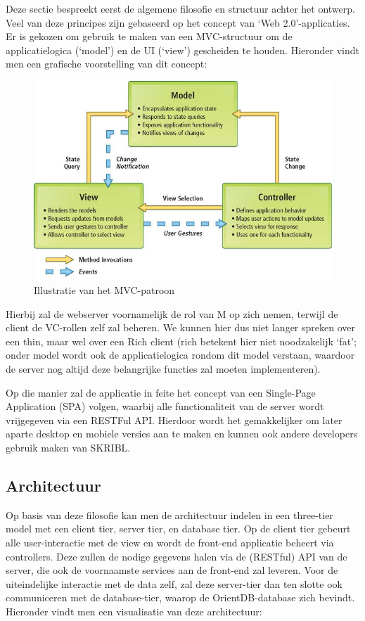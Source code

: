 \documentclass{article}
\begin{document}
Deze sectie bespreekt eerst de algemene filosofie en structuur achter het ontwerp. Veel van deze principes zijn gebaseerd op het concept van `Web 2.0'-applicaties.
Er is gekozen om gebruik te maken van een MVC-structuur om de applicatielogica (`model') en de UI (`view') gescheiden te houden. 
Hieronder vindt men een grafische voorstelling van dit concept:

\begin{figure}[!h]
\centering
 \includegraphics[width=140mm]{MVC.jpg}
 \caption{Illustratie van het MVC-patroon}
 \label{Model-View-Controller}
\end{figure}

\thispagestyle{fancy}
Hierbij zal de webserver voornamelijk de rol van M op zich nemen, terwijl de client de VC-rollen zelf zal beheren. We kunnen hier dus niet langer spreken over een thin, maar wel over een Rich client (rich betekent hier niet noodzakelijk `fat'; onder model wordt ook de applicatielogica rondom dit model verstaan, waardoor de server nog altijd deze belangrijke functies zal moeten implementeren).

Op die manier zal de applicatie in feite het concept van een Single-Page Application (SPA) volgen, waarbij alle functionaliteit van de server wordt vrijgegeven via een RESTFul API. Hierdoor wordt het gemakkelijker om later aparte desktop en mobiele versies aan te maken en kunnen ook andere developers gebruik maken van SKRIBL.

\subsection{Architectuur}

Op basis van deze filosofie kan men de architectuur indelen in een three-tier model met een client tier, server tier, en database tier. Op de client tier gebeurt alle user-interactie met de view en wordt de front-end applicatie beheert via controllers. Deze zullen de nodige gegevens halen via de (RESTful) API van de server, die ook de voornaamste services aan de front-end zal leveren. Voor de uiteindelijke interactie met de data zelf, zal deze server-tier dan ten slotte ook communiceren met de database-tier, waarop de OrientDB-database zich bevindt. \\
Hieronder vindt men een visualisatie van deze architectuur:
\end{document}
